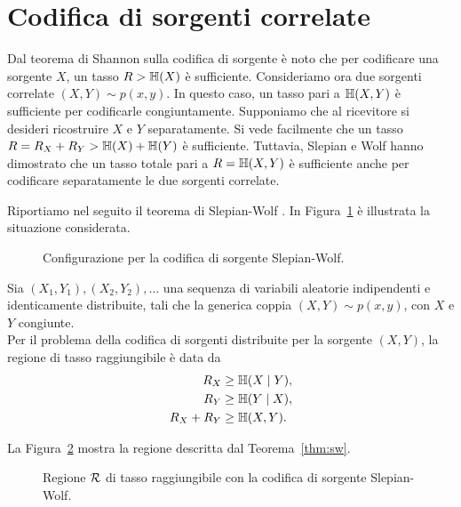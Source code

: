 \section{Codifica di sorgenti correlate}
\label{sec:correlated-sources-encoding}

Dal teorema di Shannon sulla codifica di sorgente
\cite{10.1002/j.1538-7305.1948.tb01338.x} è noto che per codificare una
sorgente \(X\), un tasso \(R > \entropy{X}\) è sufficiente. Consideriamo ora
due sorgenti correlate \((X,Y) \sim p(x, y)\). In questo caso, un tasso pari a
\(\entropy{X,Y}\) è sufficiente per codificarle congiuntamente. Supponiamo che
al ricevitore si desideri ricostruire \(X\) e \(Y\) separatamente. Si vede
facilmente che un tasso \(R = R_X + R_Y > \entropy{X} + \entropy{Y}\) è
sufficiente. Tuttavia, Slepian e Wolf \cite{1055037} hanno dimostrato che un
tasso totale pari a \(R = \entropy{X,Y}\) è sufficiente anche per codificare
separatamente le due sorgenti correlate.

Riportiamo nel seguito il teorema di Slepian-Wolf
\cite{10.1002/047174882X.ch15}. In Figura~\ref{fig:sw-configuration} è
illustrata la situazione considerata.

\begin{figure}[ht]
    \centering
    
    \caption{Configurazione per la codifica di sorgente Slepian-Wolf.}
    \label{fig:sw-configuration}
\end{figure}

\begin{thm}
    \label{thm:sw}

    Sia \((X_1,Y_1),(X_2,Y_2),\dots\) una sequenza di variabili aleatorie
    indipendenti e identicamente distribuite, tali che la generica coppia
    \((X,Y) \sim p(x, y)\), con \(X\) e \(Y\) congiunte.\\
    Per il problema della codifica di sorgenti distribuite per la sorgente
    \((X,Y)\), la regione di tasso raggiungibile è data da
    \begin{alignat}{1}
        R_X &\ge \entropy{X \given Y}, \label{eq:SW1} \\
        R_Y &\ge \entropy{Y \given X}, \label{eq:SW2} \\
        R_X + R_Y &\ge \entropy{X,Y}. \label{eq:SWsum}
    \end{alignat}
\end{thm}

La Figura~\ref{fig:sw-rate-region} mostra la regione descritta dal
Teorema~\ref{thm:sw}.

\begin{figure}[ht]
    \centering
    
    \caption{Regione \(\mathcal{R}\) di tasso raggiungibile con la codifica di
    sorgente Slepian-Wolf.}
    \label{fig:sw-rate-region}
\end{figure}
